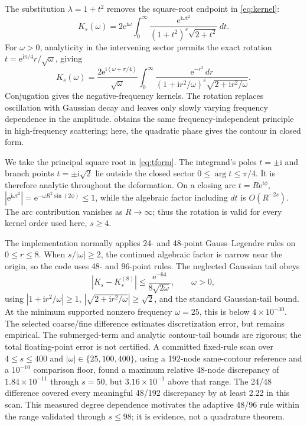 \documentclass[10pt]{article}
\newcommand{\iu}{\mathrm{i}}
\newcommand{\e}{\mathrm{e}}
\begin{document}
The substitution \(\lambda=1+t^2\) removes the square-root endpoint in
\cref{eq:kernel}:
\begin{equation}
 K_s(\omega)=2\e^{\iu\omega}\int_0^\infty
 \frac{\e^{\iu\omega t^2}}{
 (1+t^2)^s\sqrt{2+t^2}}\,dt.
 \label{eq:tform}
\end{equation}
For \(\omega>0\), analyticity in the intervening sector permits the exact
rotation
\(t=\e^{\iu\pi/4}r/\sqrt\omega\), giving
\begin{equation}
 K_s(\omega)=\frac{2\e^{\iu(\omega+\pi/4)}}{\sqrt\omega}
 \int_0^\infty \frac{\e^{-r^2}\,dr}{
 (1+\iu r^2/\omega)^s\sqrt{2+\iu r^2/\omega}}.
 \label{eq:gaussian}
\end{equation}
Conjugation gives the negative-frequency kernels.  The rotation replaces
oscillation with Gaussian decay and leaves only slowly varying frequency
dependence in the amplitude.  \citet{GibbsEtAl2020} obtains the same
frequency-independent principle in high-frequency scattering; here, the
quadratic phase gives the contour in closed form.

We take the principal square root in \cref{eq:tform}.  The
integrand's poles \(t=\pm\iu\) and branch points
\(t=\pm\iu\sqrt2\) lie outside the closed sector
\(0\leq\arg t\leq\pi/4\).  It is therefore analytic throughout the deformation.
On a closing arc \(t=R\e^{\iu\phi}\),
\(|\e^{\iu\omega t^2}|=\e^{-\omega R^2\sin(2\phi)}\leq1\), while the
algebraic factor including \(dt\) is \(O(R^{-2s})\).  The arc contribution
vanishes as \(R\to\infty\); thus the rotation is valid for every kernel order
used here, \(s\geq4\).

The implementation normally applies 24- and 48-point Gauss--Legendre rules on
\(0\leq r\leq8\).  When \(s/|\omega|\geq2\), the continued algebraic factor is
narrow near the origin, so the code uses 48- and 96-point rules.  The neglected
Gaussian tail obeys
\begin{equation}
 |K_s-K_s^{(8)}|\leq
 \frac{\e^{-64}}{8\sqrt{2\omega}},
 \qquad \omega>0,
 \label{eq:gausstail}
\end{equation}
using \(|1+\iu r^2/\omega|\geq1\),
\(|\sqrt{2+\iu r^2/\omega}|\geq\sqrt2\), and the standard Gaussian-tail
bound.  At the minimum supported nonzero frequency \(\omega=25\), this is
below \(4\times10^{-30}\).  The selected coarse/fine difference estimates
discretization error, but remains empirical.  The submerged-term and analytic
contour-tail bounds are rigorous; the total floating-point error is not
certified.  A committed fixed-rule scan over \(4\leq s\leq400\) and
\(|\omega|\in\{25,100,400\}\), using a 192-node same-contour reference and a
\(10^{-10}\) comparison floor, found a maximum relative 48-node discrepancy
of \(1.84\times10^{-11}\) through \(s=50\), but \(3.16\times10^{-1}\) above
that range.  The 24/48 difference covered every meaningful 48/192 discrepancy
by at least 2.22 in this scan.  This measured degree dependence motivates the
adaptive 48/96 rule within the range validated through \(s\leq98\); it is
evidence, not a quadrature theorem.
\end{document}
